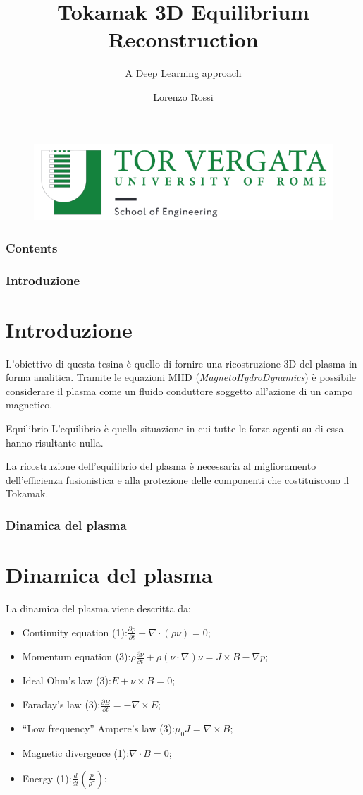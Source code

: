 \documentclass{beamer}
\title{Tokamak 3D Equilibrium Reconstruction}
\subtitle{A Deep Learning approach}
\author{Lorenzo Rossi}
\institute{Università di Rome "Tor Vergata"} %
\begin{document}
\begin{frame}
	\titlepage{}
	\vspace{-1cm}
	\begin{figure}
		\centering
		\includegraphics[scale=0.3]{2022-06-06-23-17-53.png}%
	\end{figure}
\end{frame}
\begin{frame}
	\frametitle{Contents}
	\tableofcontents
\end{frame}
\begin{frame}
	\frametitle{Introduzione}
	\section{Introduzione}
	L'obiettivo di questa tesina è quello di fornire una ricostruzione 3D del plasma in forma analitica.
	Tramite le equazioni MHD (\emph{MagnetoHydroDynamics}) è possibile considerare il plasma come un fluido conduttore soggetto all'azione di un campo magnetico.
	\begin{block}{Equilibrio}
		L'equilibrio è quella situazione in cui tutte le forze agenti su di essa hanno risultante nulla.
	\end{block}
	La ricostruzione dell'equilibrio del plasma è necessaria al miglioramento dell'efficienza fusionistica e alla protezione delle componenti che costituiscono il Tokamak.
\end{frame}
\begin{frame}
	\frametitle{Dinamica del plasma}
	\section{Dinamica del plasma}
	La dinamica del plasma viene descritta da:
	\begin{itemize}
		\item Continuity equation (1):\(\frac{\partial\rho}{\partial t}+\nabla\cdot(\rho \nu)=0\);
		\item Momentum equation (3):\(\rho \frac{\partial\nu}{\partial t}+\rho(\nu\cdot\nabla)\nu=J\times B-\nabla p\);
		\item Ideal Ohm's law (3):\(E+\nu\times B=0\);
		\item Faraday's law (3):\(\frac{\partial B}{\partial t}=-\nabla\times E\);%
		\item ``Low frequency'' Ampere's law (3):\(\mu_{0}J=\nabla\times B\);%
		\item Magnetic divergence (1):\(\nabla\cdot B=0\);
		\item Energy (1):\(\frac{d}{dt}(\frac{p}{\rho^{\gamma}})\);
	\end{itemize}
\end{frame}
\end{document}
